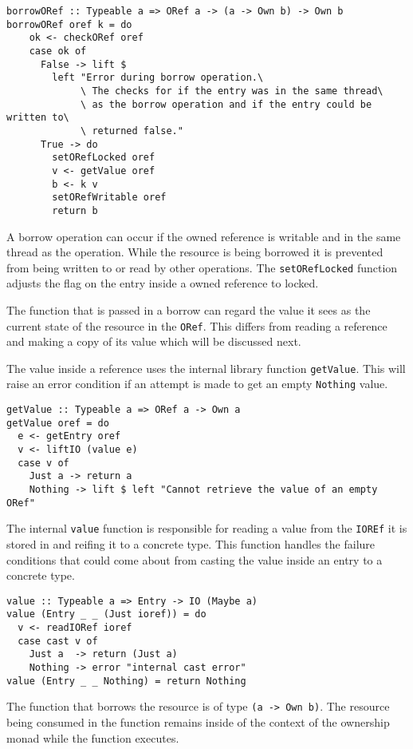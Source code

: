 \documentclass[onehalf,11pt]{beavtex}
\begin{document}
\begin{verbatim}
borrowORef :: Typeable a => ORef a -> (a -> Own b) -> Own b
borrowORef oref k = do
    ok <- checkORef oref
    case ok of
      False -> lift $
        left "Error during borrow operation.\
             \ The checks for if the entry was in the same thread\
             \ as the borrow operation and if the entry could be written to\
             \ returned false."
      True -> do
        setORefLocked oref
        v <- getValue oref
        b <- k v
        setORefWritable oref
        return b
\end{verbatim}

A borrow operation can occur if the owned reference is writable and
in the same thread as the operation.
While the resource is being borrowed it is prevented from being written to or
read by other operations. The \texttt{setORefLocked} function adjusts the flag
on the entry inside a owned reference to locked.

The function that is passed in a borrow can regard the value it sees as the
current state of the resource in the \texttt{ORef}. This differs from reading a
reference and making a copy of its value which will be discussed next.

The value inside a reference uses the internal library function
\texttt{getValue}. This will raise an error condition if an
attempt is made to get an empty \texttt{Nothing} value.

\begin{verbatim}
getValue :: Typeable a => ORef a -> Own a
getValue oref = do
  e <- getEntry oref
  v <- liftIO (value e)
  case v of
    Just a -> return a
    Nothing -> lift $ left "Cannot retrieve the value of an empty ORef"
\end{verbatim}

The internal \texttt{value} function is responsible for reading a value from
the \texttt{IOREf} it is stored in and reifing it to a concrete type.
This function handles the failure conditions that could come
about from casting the value inside an entry to a concrete type.

\begin{verbatim}
value :: Typeable a => Entry -> IO (Maybe a)
value (Entry _ _ (Just ioref)) = do
  v <- readIORef ioref
  case cast v of
    Just a  -> return (Just a)
    Nothing -> error "internal cast error"
value (Entry _ _ Nothing) = return Nothing
\end{verbatim}

The function that borrows the resource is of type \texttt{(a -> Own b)}. The
resource being consumed in the function remains inside of the context of the
ownership monad while the function executes. %
\end{document}
